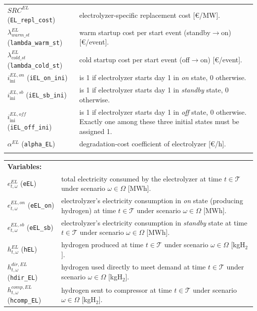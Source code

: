 \documentclass{article}
\begin{document}
\noindent
\begin{tabularx}{\textwidth}{@{}l X@{}}
    $SRC^{EL}$ \hspace{9mm} (\verb|EL_repl_cost|)
      & electrolyzer-specific replacement cost [\euro{}/MW]. \\
    $\lambda^{EL}_{warm\_st}$ (\verb|lambda_warm_st|)
      & warm startup cost per start event (standby$\rightarrow$on) [\euro{}/event]. \\
    $\lambda^{EL}_{cold\_st}$ (\verb|lambda_cold_st|)
      & cold startup cost per start event (off$\rightarrow$on) [\euro{}/event]. \\
    $i^{EL,on}_{\mathrm{ini}}$ (\verb|iEL_on_ini|)
      & is 1 if electrolyzer starts day 1 in \emph{on} state, 0 otherwise. \\
    $i^{EL,sb}_{\mathrm{ini}}$ (\verb|iEL_sb_ini|)
      & is 1 if electrolyzer starts day 1 in \emph{standby} state, 0 otherwise. \\
    $i^{EL,off}_{\mathrm{ini}}$ (\verb|iEL_off_ini|)
      & is 1 if electrolyzer starts day 1 in \emph{off} state, 0 otherwise.
        Exactly one among these three initial states must be assigned 1. \\
    $\alpha^{EL}$ (\verb|alpha_EL|)
      & degradation-cost coefficient of electrolyzer [\euro{}/h]. \\
      \\
\end{tabularx}

\noindent
\begin{tabularx}{\textwidth}{@{}l X@{}}
    \textbf{Variables:} & \\
    $e^{EL}_{t,\omega}$ (\verb|eEL|)
      & total electricity consumed by the electrolyzer at time $t \in \mathcal{T}$
        under scenario $\omega \in \Omega$ [MWh]. \\
    $e^{EL,on}_{t,\omega}$ (\verb|eEL_on|)
      & electrolyzer's electricity consumption in \emph{on} state (producing hydrogen)
        at time $t \in \mathcal{T}$ under scenario $\omega \in \Omega$ [MWh]. \\
    $e^{EL,sb}_{t,\omega}$ (\verb|eEL_sb|)
      & electrolyzer's electricity consumption in \emph{standby} state
        at time $t \in \mathcal{T}$ under scenario $\omega \in \Omega$ [MWh]. \\
    $h^{EL}_{t,\omega}$ (\verb|hEL|)
      & hydrogen produced at time $t \in \mathcal{T}$
        under scenario $\omega \in \Omega$ [kgH$_2$]. \\
    $h^{dir,EL}_{t,\omega}$ (\verb|hdir_EL|)
      & hydrogen used directly to meet demand at time $t \in \mathcal{T}$
        under scenario $\omega \in \Omega$ [kgH$_2$]. \\
    $h^{comp,EL}_{t,\omega}$ (\verb|hcomp_EL|)
      & hydrogen sent to compressor at time $t \in \mathcal{T}$
        under scenario $\omega \in \Omega$ [kgH$_2$]. \\
\end{tabularx}
\end{document}
